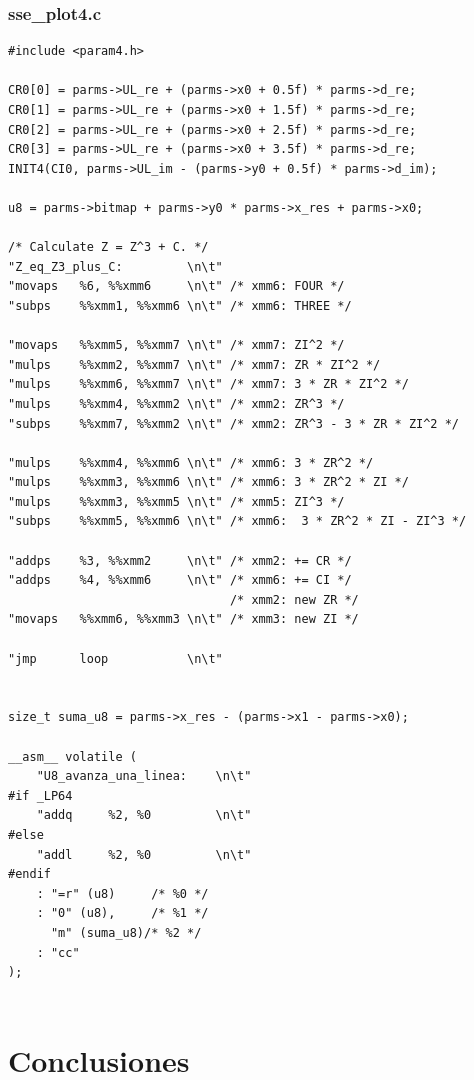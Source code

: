 \documentclass[a4paper,10pt]{article}
\begin{document}
\subsubsection{sse_plot4.c}
\begin{verbatim}
#include <param4.h>

CR0[0] = parms->UL_re + (parms->x0 + 0.5f) * parms->d_re;
CR0[1] = parms->UL_re + (parms->x0 + 1.5f) * parms->d_re;
CR0[2] = parms->UL_re + (parms->x0 + 2.5f) * parms->d_re;
CR0[3] = parms->UL_re + (parms->x0 + 3.5f) * parms->d_re;
INIT4(CI0, parms->UL_im - (parms->y0 + 0.5f) * parms->d_im);

u8 = parms->bitmap + parms->y0 * parms->x_res + parms->x0;

/* Calculate Z = Z^3 + C. */
"Z_eq_Z3_plus_C:         \n\t"
"movaps   %6, %%xmm6     \n\t" /* xmm6: FOUR */
"subps    %%xmm1, %%xmm6 \n\t" /* xmm6: THREE */

"movaps   %%xmm5, %%xmm7 \n\t" /* xmm7: ZI^2 */
"mulps    %%xmm2, %%xmm7 \n\t" /* xmm7: ZR * ZI^2 */
"mulps    %%xmm6, %%xmm7 \n\t" /* xmm7: 3 * ZR * ZI^2 */
"mulps    %%xmm4, %%xmm2 \n\t" /* xmm2: ZR^3 */
"subps    %%xmm7, %%xmm2 \n\t" /* xmm2: ZR^3 - 3 * ZR * ZI^2 */

"mulps    %%xmm4, %%xmm6 \n\t" /* xmm6: 3 * ZR^2 */
"mulps    %%xmm3, %%xmm6 \n\t" /* xmm6: 3 * ZR^2 * ZI */
"mulps    %%xmm3, %%xmm5 \n\t" /* xmm5: ZI^3 */
"subps    %%xmm5, %%xmm6 \n\t" /* xmm6:  3 * ZR^2 * ZI - ZI^3 */

"addps    %3, %%xmm2     \n\t" /* xmm2: += CR */
"addps    %4, %%xmm6     \n\t" /* xmm6: += CI */
							   /* xmm2: new ZR */
"movaps   %%xmm6, %%xmm3 \n\t" /* xmm3: new ZI */

"jmp      loop           \n\t"


size_t suma_u8 = parms->x_res - (parms->x1 - parms->x0);
		
__asm__ volatile (
	"U8_avanza_una_linea:    \n\t"
#if _LP64
	"addq     %2, %0         \n\t"
#else
	"addl     %2, %0         \n\t"
#endif		
	: "=r" (u8)		/* %0 */
	: "0" (u8),		/* %1 */
	  "m" (suma_u8)/* %2 */
	: "cc"
);


\end{verbatim}

\pagebreak


\section{Conclusiones}


\pagebreak
\end{document}
